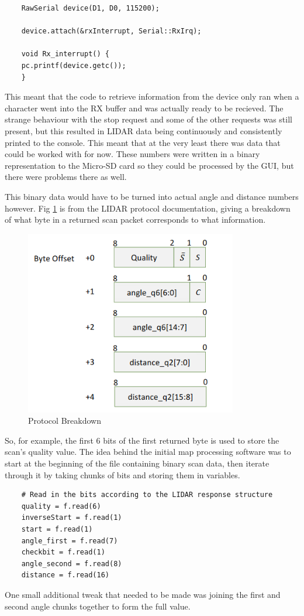 	\begin{lstlisting}
	RawSerial device(D1, D0, 115200);
	
	device.attach(&rxInterrupt, Serial::RxIrq);
	
	void Rx_interrupt() {
	pc.printf(device.getc());
	}
	\end{lstlisting}
	This meant that the code to retrieve information from the device only ran when a character went into the RX buffer and was actually ready to be recieved. The strange behaviour with the stop request and some of the other requests was still present, but this resulted in LIDAR data being continuously and consistently printed to the console. This meant that at the very least there was data that could be worked with for now. These numbers were written in a binary representation to the Micro-SD card so they could be processed by the GUI, but there were problems there as well.
	
	This binary data would have to be turned into actual angle and distance numbers however. Fig \ref{fig:protocolbreakdown} is from the LIDAR protocol documentation, giving a breakdown of what byte in a returned scan packet corresponds to what information.
	
	\begin{figure}[ht]
		\centering
		\includegraphics[width=.6\linewidth]{SYNTHESIS/protocolbreakdown.png}
		\caption{Protocol Breakdown}
		\label{fig:protocolbreakdown}
	\end{figure}
	
	So, for example, the first 6 bits of the first returned byte is used to store the scan's quality value. The idea behind the initial map processing software was to start at the beginning of the file containing binary scan data, then iterate through it by taking chunks of bits and storing them in variables.
	
	\begin{lstlisting}
	# Read in the bits according to the LIDAR response structure
	quality = f.read(6)
	inverseStart = f.read(1)
	start = f.read(1)
	angle_first = f.read(7)
	checkbit = f.read(1)
	angle_second = f.read(8)
	distance = f.read(16)
	\end{lstlisting}
	One small additional tweak that needed to be made was joining the first and second angle chunks together to form the full value.
	
